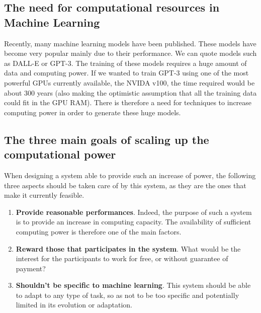\documentclass{article}
\begin{document}
\subsection{The need for computational resources in Machine Learning}
Recently, many machine learning models have been published. These models have become very popular mainly due to their
performance. We can quote models such as DALL-E or GPT-3. The training of these models requires a huge amount of data
and computing power. If we wanted to train GPT-3 using one of the most powerful GPUs currently available,
the NVIDA v100, the time required would be about 300 years (also making the optimistic assumption that all the
training data could fit in the GPU RAM). There is therefore a need for techniques to increase computing power in order
to generate these huge models.
\subsection{The three main goals of scaling up the computational power}
When designing a system able to provide such an increase of power, the following three aspects should be taken care of
by this system, as they are the ones that make it currently feasible.
\begin{enumerate}
    \item \textbf{Provide reasonable performances}. Indeed, the purpose of such a system is to provide an increase in computing
     capacity. The availability of sufficient computing power is therefore one of the main factors.
    \item \textbf{Reward those that participates in the system}. What would be the interest for the participants to work for
     free, or without guarantee of payment?
    \item \textbf{Shouldn't be specific to machine learning}. This system should be able to adapt to any type of task, so as not
     to be too specific and potentially limited in its evolution or adaptation.
\end{enumerate}
\end{document}
